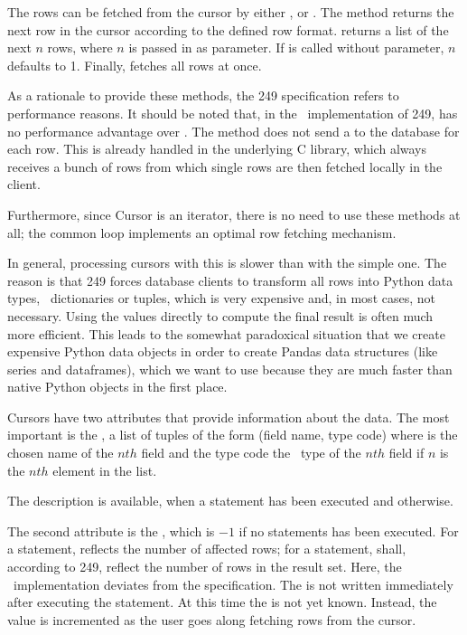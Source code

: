 The rows can be fetched from the cursor by either
,
 or
.
The method  returns the next row
in the cursor according to the defined row format.
 returns a list of the next $n$ rows,
where $n$ is passed in as parameter. If 
is called without parameter, $n$ defaults to 1.
Finally,  fetches all rows at once.

As a rationale to provide these methods,
the  249 specification refers
to performance reasons. It should be noted
that, in the \nowdb\ implementation of
 249,  has no performance
advantage over .
The method does not send a 
to the database for each row.
This is already handled in the underlying
C library, which always receives a bunch of rows
from which single rows are then fetched locally
in the client.

Furthermore, since Cursor is an iterator,
there is no need to use these methods at all;
the common  loop implements an optimal
row fetching mechanism.

In general, processing cursors with this 
is slower than with the simple one.
The reason is that  249 forces
database clients to transform all rows into Python
data types, \viz\ dictionaries or tuples,
which is very expensive and, in most cases,
not necessary.
Using the values directly to compute the final result
is often much more efficient.
This leads to the somewhat paradoxical situation
that we create expensive Python data objects
in order to create Pandas data structures (like series and
dataframes), which we want to use because they
are much faster than native Python objects in the first place.

Cursors have two attributes that provide information
about the data. The most important is the ,
a list of tuples of the form (field name, type code)
where  is the chosen name of the $nth$ field
and the type code the \nowdb\ type of the $nth$ field if
$n$ is the $nth$ element in the list.

The description is available, when a  statement
has been executed and  otherwise.

The second attribute is the , which
is $-1$ if no statements has been executed.
For a  statement, 
reflects the number of affected rows;
for a  statement,  shall,
according to  249, reflect
the number of rows in the result set.
Here, the \nowdb\ implementation deviates from the specification.
The  is not written immediately after
executing the statement. At this time the 
is not yet known. Instead, the value is incremented
as the user goes along fetching rows from the cursor.


